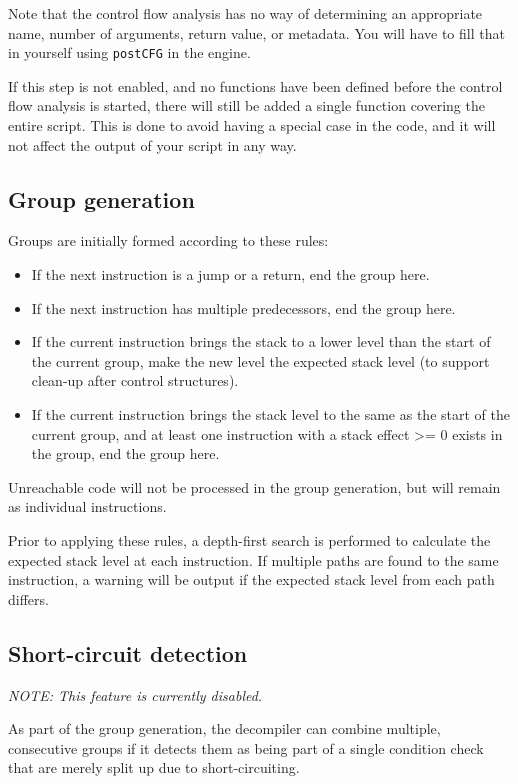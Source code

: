 Note that the control flow analysis has no way of determining an appropriate name, number of arguments, return value, or metadata. You will have to fill that in yourself using \verb+postCFG+ in the engine.

If this step is not enabled, and no functions have been defined before the control flow analysis is started, there will still be added a single function covering the entire script. This is done to avoid having a special case in the code, and it will not affect the output of your script in any way.

\subsection{Group generation}
Groups are initially formed according to these rules:
\begin{itemize}
\item If the next instruction is a jump or a return, end the group here.
\item If the next instruction has multiple predecessors, end the group here.
\item If the current instruction brings the stack to a lower level than the start of the current group, make the new level the expected stack level (to support clean-up after control structures).
\item If the current instruction brings the stack level to the same as the start of the current group, and at least one instruction with a stack effect >= 0 exists in the group, end the group here.
\end{itemize}

Unreachable code will not be processed in the group generation, but will remain as individual instructions.

Prior to applying these rules, a depth-first search is performed to calculate the expected stack level at each instruction. If multiple paths are found to the same instruction, a warning will be output if the expected stack level from each path differs.

\subsection{Short-circuit detection}
\emph{NOTE: This feature is currently disabled.}

As part of the group generation, the decompiler can combine multiple, consecutive groups if it detects them as being part of a single condition check that are merely split up due to short-circuiting.

